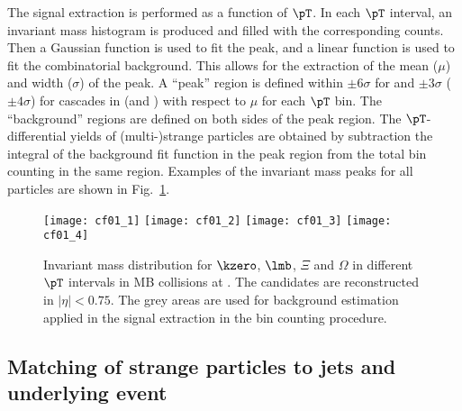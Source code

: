 \documentclass[ALICE,manyauthors]{cernphprep}
\begin{document}
The signal extraction is performed as a function of $\pT$.
In each $\pT$ interval, an invariant mass histogram is produced and filled with the corresponding counts.
Then a Gaussian function is used to fit the peak, and a linear function is used to fit the combinatorial background.
This allows for the extraction of the mean ($\mu$) and width ($\sigma$) of the peak.
A ``peak'' region is defined within $\pm 6\sigma$ for \Vzeros and $\pm 3\sigma$ ($\pm 4\sigma$) for cascades in \pp (and \pPb) with respect to $\mu$ for each $\pT$ bin.
The ``background'' regions are defined on both sides of the peak region.
The $\pT$-differential yields of (multi-)strange particles are obtained by subtraction the integral of the background fit function in the peak region from the total bin counting in the same region.
Examples of the invariant mass peaks for all particles are shown in Fig.~\ref{fig:InvM}.
\begin{figure}[!ht]
	\begin{center}
		\texttt{[image: cf01\_1]}
		\texttt{[image: cf01\_2]}
		\texttt{[image: cf01\_3]}
		\texttt{[image: cf01\_4]}
		\caption{Invariant mass distribution for $\kzero$, $\lmb$, $\Xi$ and $\Omega$ in different $\pT$ intervals in MB \pPb collisions at \fivenn. The candidates are reconstructed in $|\eta|<0.75$.
			The grey areas are used for background estimation applied in the signal extraction in the bin counting procedure.}
		\label{fig:InvM}
	\end{center}
\end{figure}

\subsection{Matching of strange particles to jets and underlying event}%
\label{sec:ParJetMatch}
\end{document}
